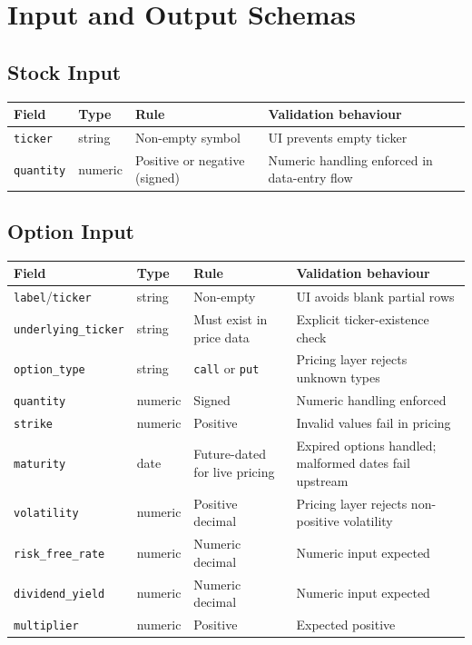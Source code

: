 \documentclass[11pt]{article}
\newcommand{\code}[1]{\texttt{#1}}
\begin{document}
\section{Input and Output Schemas}

\subsection{Stock Input}

\begin{center}
\begin{tabular}{L{2.5cm}L{1.8cm}L{4cm}L{5cm}}
\toprule
\textbf{Field} & \textbf{Type} & \textbf{Rule} & \textbf{Validation behaviour} \\
\midrule
\code{ticker}   & string  & Non-empty symbol             & UI prevents empty ticker \\
\code{quantity} & numeric & Positive or negative (signed) & Numeric handling enforced in data-entry flow \\
\bottomrule
\end{tabular}
\end{center}

\subsection{Option Input}

\begin{center}
\begin{tabular}{L{2.8cm}L{1.8cm}L{3.5cm}L{4.5cm}}
\toprule
\textbf{Field} & \textbf{Type} & \textbf{Rule} & \textbf{Validation behaviour} \\
\midrule
\code{label}/\code{ticker}    & string & Non-empty & UI avoids blank partial rows \\
\code{underlying\_ticker}      & string & Must exist in price data & Explicit ticker-existence check \\
\code{option\_type}           & string & \code{call} or \code{put} & Pricing layer rejects unknown types \\
\code{quantity}               & numeric & Signed & Numeric handling enforced \\
\code{strike}                 & numeric & Positive & Invalid values fail in pricing \\
\code{maturity}               & date    & Future-dated for live pricing & Expired options handled; malformed dates fail upstream \\
\code{volatility}             & numeric & Positive decimal & Pricing layer rejects non-positive volatility \\
\code{risk\_free\_rate}       & numeric & Numeric decimal & Numeric input expected \\
\code{dividend\_yield}        & numeric & Numeric decimal & Numeric input expected \\
\code{multiplier}             & numeric & Positive & Expected positive \\
\bottomrule
\end{tabular}
\end{center}
\end{document}

